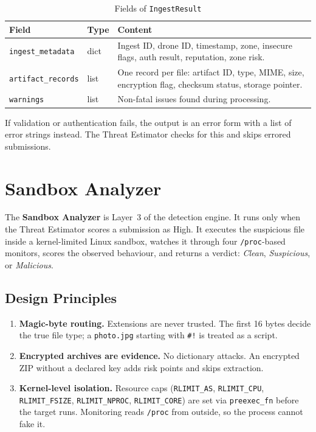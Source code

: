 \documentclass[12pt, a4paper]{report}
\begin{document}
\begin{table}[H]
\centering
\caption{Fields of \texttt{IngestResult}}
\label{tab:ingest_result_fields}
\begin{tabular}{|l|l|p{7cm}|}
\hline
\textbf{Field} & \textbf{Type} & \textbf{Content} \\
\hline
\texttt{ingest\_metadata} & dict & Ingest ID, drone ID, timestamp, zone, insecure flags, auth result, reputation, zone risk. \\
\hline
\texttt{artifact\_records} & list & One record per file: artifact ID, type, MIME, size, encryption flag, checksum status, storage pointer. \\
\hline
\texttt{warnings} & list & Non-fatal issues found during processing. \\
\hline
\end{tabular}
\end{table}

If validation or authentication fails, the output is an error form with a list of error strings instead.
The Threat Estimator checks for this and skips errored submissions.

\cleardoublepage


\chapter{Sandbox Analyzer}
\label{chap:sandbox}

The \textbf{Sandbox Analyzer} is Layer~3 of the detection engine. It runs only
when the Threat Estimator scores a submission as High. It executes the
suspicious file inside a kernel-limited Linux sandbox, watches it through four
\texttt{/proc}-based monitors, scores the observed behaviour, and returns a
verdict: \emph{Clean}, \emph{Suspicious}, or \emph{Malicious}.

\section{Design Principles}

\begin{enumerate}
    \item \textbf{Magic-byte routing.} Extensions are never trusted. The first
          16 bytes decide the true file type; a \texttt{photo.jpg} starting
          with \texttt{\#!} is treated as a script.
    \item \textbf{Encrypted archives are evidence.} No dictionary attacks.
          An encrypted ZIP without a declared key adds risk points and skips
          extraction.
    \item \textbf{Kernel-level isolation.} Resource caps
          (\texttt{RLIMIT\_AS}, \texttt{RLIMIT\_CPU}, \texttt{RLIMIT\_FSIZE},
          \texttt{RLIMIT\_NPROC}, \texttt{RLIMIT\_CORE}) are set via
          \texttt{preexec\_fn} before the target runs. Monitoring reads
          \texttt{/proc} from outside, so the process cannot fake it.
\end{enumerate}
\end{document}
